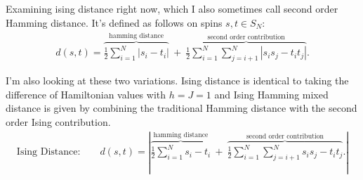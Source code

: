 Examining ising distance right now, which I also sometimes call second order Hamming distance. It's defined as follows on spins $s,t \in S_N$:
\begin{align*}
	d(s,t) = \overbrace{\frac{1}{2} \sum_{i=1}^N | s_i - t_i|}^{\text{hamming distance}} ~+~ \overbrace{\frac{1}{2} \sum_{i=1}^N\sum_{j=i+1}^N |s_is_j - t_it_j|}^{\text{second order contribution}}.
\end{align*}

I'm also looking at these two variations. Ising distance is identical to taking the difference of Hamiltonian values with $h = J = 1$ and Ising Hamming mixed distance is given by combining the traditional Hamming distance with the second order Ising contribution.
\begin{align*}
	\text{Ising Distance:} \hspace{2em} d(s,t) = \left|\overbrace{\frac{1}{2} \sum_{i=1}^N  s_i - t_i}^{\text{hamming distance}} ~+~ \overbrace{\frac{1}{2} \sum_{i=1}^N\sum_{j=i+1}^N s_is_j - t_it_j}^{\text{second order contribution}}.\right|
\end{align*}


